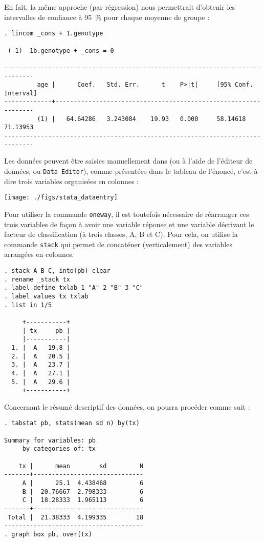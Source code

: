 En fait, la même approche (par régression) nous permettrait d'obtenir les
intervalles de confiance à 95~\% pour chaque moyenne de groupe :
\begin{verbatim}
. lincom _cons + 1.genotype

 ( 1)  1b.genotype + _cons = 0

------------------------------------------------------------------------------
         age |      Coef.   Std. Err.      t    P>|t|     [95% Conf. Interval]
-------------+----------------------------------------------------------------
         (1) |   64.64286   3.243084    19.93   0.000     58.14618    71.13953
------------------------------------------------------------------------------
\end{verbatim}

\soln{\ref{exo:9.6}}
Les données peuvent être saisies manuellement dans \Stata (ou à l'aide de
l'éditeur de données, ou \texttt{Data Editor}), comme présentées dans le
tableau de l'énoncé, c'est-à-dire trois variables organisées en colonnes :

\texttt{[image: ./figs/stata\_dataentry]}

Pour utiliser la commande \texttt{oneway}, il est toutefois nécessaire de
réarranger ces trois variables de façon à avoir une variable réponse et une
variable décrivant le facteur de classification (à trois classes, A, B et
C). Pour cela, on utilise la commande \texttt{stack} qui permet de
concaténer (verticalement) des variables arrangées en colonnes.
\begin{verbatim}
. stack A B C, into(pb) clear
. rename _stack tx
. label define txlab 1 "A" 2 "B" 3 "C"
. label values tx txlab
. list in 1/5

     +-----------+
     | tx     pb |
     |-----------|
  1. |  A   19.8 |
  2. |  A   20.5 |
  3. |  A   23.7 |
  4. |  A   27.1 |
  5. |  A   29.6 |
     +-----------+
\end{verbatim}

Concernant le résumé descriptif des données, on pourra procéder comme suit :
\begin{verbatim}
. tabstat pb, stats(mean sd n) by(tx)

Summary for variables: pb
     by categories of: tx 

    tx |      mean        sd         N
-------+------------------------------
     A |      25.1  4.438468         6
     B |  20.76667  2.798333         6
     C |  18.28333  1.965113         6
-------+------------------------------
 Total |  21.38333  4.199335        18
--------------------------------------
. graph box pb, over(tx)
\end{verbatim}


